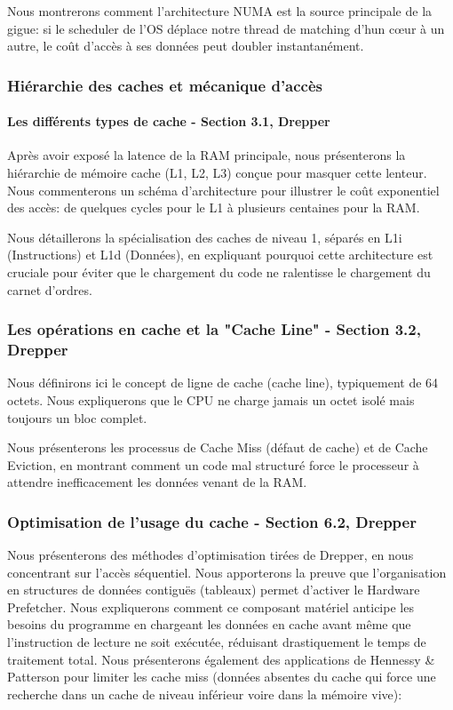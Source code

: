 Nous montrerons comment l'architecture NUMA est la source principale de la gigue: si le scheduler de l'OS déplace notre thread de matching d'hun cœur à un autre, le coût d'accès à ses données peut doubler instantanément.

\subsubsection{Hiérarchie des caches et mécanique d'accès}

\paragraph{Les différents types de cache - Section 3.1, Drepper}

Après avoir exposé la latence de la RAM principale, nous présenterons la hiérarchie de mémoire cache (L1, L2, L3) conçue pour masquer cette lenteur. Nous commenterons un schéma d'architecture pour illustrer le coût exponentiel des accès: de quelques cycles pour le L1 à plusieurs centaines pour la RAM.

Nous détaillerons la spécialisation des caches de niveau 1, séparés en L1i (Instructions) et L1d (Données), en expliquant pourquoi cette architecture est cruciale pour éviter que le chargement du code ne ralentisse le chargement du carnet d'ordres.

\subsubsection{Les opérations en cache et la "Cache Line" - Section 3.2, Drepper}

Nous définirons ici le concept de ligne de cache (cache line), typiquement de 64 octets. Nous expliquerons que le CPU ne charge jamais un octet isolé mais toujours un bloc complet.

Nous présenterons les processus de Cache Miss (défaut de cache) et de Cache Eviction, en montrant comment un code mal structuré force le processeur à attendre inefficacement les données venant de la RAM.

\subsubsection{Optimisation de l’usage du cache - Section 6.2, Drepper}

Nous présenterons des méthodes d'optimisation tirées de Drepper, en nous concentrant sur l'accès séquentiel.
Nous apporterons la preuve que l'organisation en structures de données contiguës (tableaux) permet d'activer le Hardware Prefetcher. Nous expliquerons comment ce composant matériel anticipe les besoins du programme en chargeant les données en cache avant même que l'instruction de lecture ne soit exécutée, réduisant drastiquement le temps de traitement total.
Nous présenterons également des applications de Hennessy \& Patterson pour limiter les cache miss (données absentes du cache qui force une recherche dans un cache de niveau inférieur voire dans la mémoire vive):

